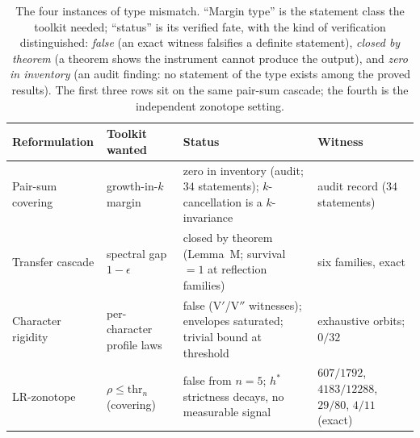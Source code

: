 \begin{table}[htbp]
\centering
\small
\caption{The four instances of type mismatch. ``Margin type'' is the
statement class the toolkit needed; ``status'' is its verified fate,
with the kind of verification distinguished: \emph{false} (an exact
witness falsifies a definite statement), \emph{closed by theorem} (a
theorem shows the instrument cannot produce the output), and
\emph{zero in inventory} (an audit finding: no statement of the type
exists among the proved results). The first three rows sit on the same
pair-sum cascade; the fourth is the independent zonotope setting.}
\label{tab:instances}
\begin{tabularx}{\textwidth}{@{} l >{\raggedright\arraybackslash}X
>{\raggedright\arraybackslash}X l @{}}
\toprule
Reformulation & Toolkit wanted & Status & Witness \\
\midrule
Pair-sum covering & growth-in-$k$ margin & zero in inventory (audit;
$34$ statements); $k$-cancellation is a $k$-invariance & audit record
($34$ statements) \\
Transfer cascade & spectral gap $1-\epsilon$ & closed by theorem
(Lemma~M; survival $=1$ at reflection families) & six families, exact \\
Character rigidity & per-character profile laws & false (V$'$/V$''$
witnesses); envelopes saturated; trivial bound at threshold &
exhaustive orbits; $0/32$ \\
LR-zonotope & $\rho\le\mathrm{thr}_n$ (covering) & false from $n=5$;
$h^*$ strictness decays, no measurable signal & $607/1792$,
$4183/12288$, $29/80$, $4/11$ (exact) \\
\bottomrule
\end{tabularx}
\end{table}
